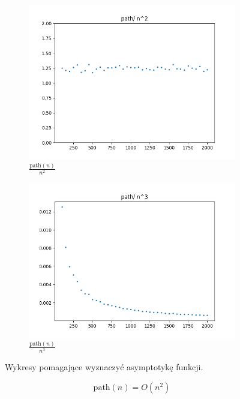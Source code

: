 \documentclass{article}
\begin{document}
\begin{figure}[H]
\begin{subfigure}{.475\textwidth}
    \includegraphics[width=\textwidth]{path_nn.png}
    \caption{\( \frac{\text{path}(n)}{n^2} \)}
    \label{fig:path_nn}
  \end{subfigure}%
  \begin{subfigure}{.475\textwidth}
    \centering
    \includegraphics[width=\textwidth]{path_nnn.png}
    \caption{\( \frac{\text{path}(n)}{n^3} \)}
    \label{fig:path_nnn}
  \end{subfigure}%
  \caption{Wykresy pomagające wyznaczyć asymptotykę funkcji.}
\end{figure}
\[\text{path}(n)=O(n^2)\]
\end{document}
